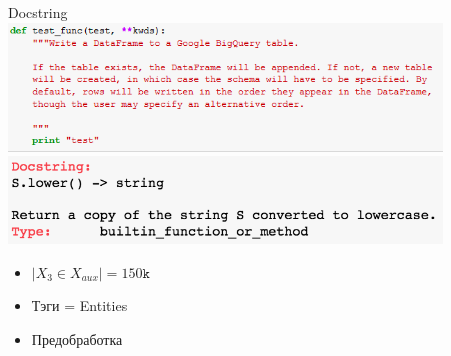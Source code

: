 \documentclass[10pt]{beamer}
\begin{document}
\begin{frame}
\begin{columns}[T]
\begin{column}[T]{0.33\textwidth}
\begin{center}
        \end{center}
    \end{column}
    \vline
    \begin{column}[T]{0.33\textwidth}
        \begin{center}
            Docstring \\
            \vskip3mm
            \includegraphics[width=0.9\textwidth]{images/docstring.png} \\
            \vskip3mm
            \includegraphics[width=0.9\textwidth]{images/docstring2.png} \\
            \begin{itemize}
                \item $|X_3 \in X_{aux}| = 150\texttt{k}$
                \item Тэги = Entities
                \item Предобработка
            \end{itemize}
        \end{center}
    \end{column}
\end{columns}

\end{frame}
\end{document}
